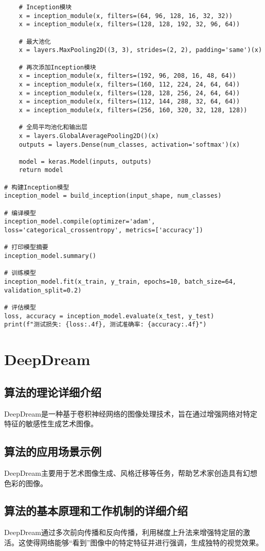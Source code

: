\begin{lstlisting}
    # Inception模块
    x = inception_module(x, filters=(64, 96, 128, 16, 32, 32))
    x = inception_module(x, filters=(128, 128, 192, 32, 96, 64))

    # 最大池化
    x = layers.MaxPooling2D((3, 3), strides=(2, 2), padding='same')(x)

    # 再次添加Inception模块
    x = inception_module(x, filters=(192, 96, 208, 16, 48, 64))
    x = inception_module(x, filters=(160, 112, 224, 24, 64, 64))
    x = inception_module(x, filters=(128, 128, 256, 24, 64, 64))
    x = inception_module(x, filters=(112, 144, 288, 32, 64, 64))
    x = inception_module(x, filters=(256, 160, 320, 32, 128, 128))

    # 全局平均池化和输出层
    x = layers.GlobalAveragePooling2D()(x)
    outputs = layers.Dense(num_classes, activation='softmax')(x)

    model = keras.Model(inputs, outputs)
    return model

# 构建Inception模型
inception_model = build_inception(input_shape, num_classes)

# 编译模型
inception_model.compile(optimizer='adam', loss='categorical_crossentropy', metrics=['accuracy'])

# 打印模型摘要
inception_model.summary()

# 训练模型
inception_model.fit(x_train, y_train, epochs=10, batch_size=64, validation_split=0.2)

# 评估模型
loss, accuracy = inception_model.evaluate(x_test, y_test)
print(f"测试损失: {loss:.4f}, 测试准确率: {accuracy:.4f}")

\end{lstlisting}


\section{DeepDream}
\subsection*{算法的理论详细介绍}
DeepDream是一种基于卷积神经网络的图像处理技术，旨在通过增强网络对特定特征的敏感性生成艺术图像。

\subsection*{算法的应用场景示例}
DeepDream主要用于艺术图像生成、风格迁移等任务，帮助艺术家创造具有幻想色彩的图像。

\subsection*{算法的基本原理和工作机制的详细介绍}
DeepDream通过多次前向传播和反向传播，利用梯度上升法来增强特定层的激活。这使得网络能够“看到”图像中的特定特征并进行强调，生成独特的视觉效果。

